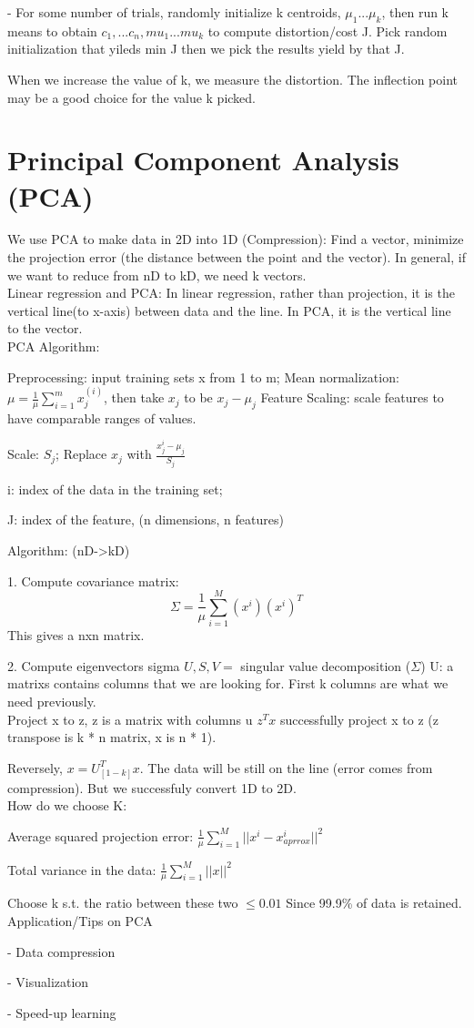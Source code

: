 \documentclass{article}
\begin{document}
- For some number of trials, randomly initialize k centroids, $\mu_1 ... \mu_k$, then run k means to obtain $c_1,...c_n, mu_1...mu_k$
to compute distortion/cost J. Pick random initialization that yileds min J
then we pick the results yield by that J.

When we increase the value of k, we measure the distortion. The inflection point may be a good choice for the value k picked.

\section*{Principal Component Analysis (PCA)}
We use PCA to make data in 2D into 1D (Compression): Find a vector, minimize the projection error (the distance between the point and the vector). In general, if we want to reduce from nD to kD, we need k vectors.\\


Linear regression and PCA: In linear regression, rather than projection, it is the vertical line(to x-axis) between data and the line. In PCA, it is the vertical line to the vector. \\

PCA Algorithm:

Preprocessing: input training sets x from 1 to m;
Mean normalization: $\mu = \frac{1}{\mu}\sum_{i=1}^m x_j^{(i)}$, then take $x_j$ to be $x_j - \mu_j$
Feature Scaling: scale features to have comparable ranges of values. 

Scale: $S_j$; Replace $x_j$ with $\frac{x_j^i - \mu_j}{S_j}$

i: index of the data in the training set; 

J: index of the feature, (n dimensions, n features)

Algorithm: (nD->kD)

1. Compute covariance matrix:
\[\Sigma = \frac{1}{\mu} \sum_{i=1}^M (x^i)(x^i)^T\]
This gives a nxn matrix.

2. Compute eigenvectors sigma
$U,S,V =$ singular value decomposition ($\Sigma $)
U: a matrixs contains columns that we are looking for. First k columns are what we need previously.\\

Project x to z, z is a matrix with columns u
$z^T x$ successfully project x to z (z transpose is k * n matrix, x is n * 1). 

Reversely, $x = U_{[1-k]}^T x$. The data will be still on the line (error comes from compression). But we successfuly convert 1D to 2D.\\

How do we choose K: 

Average squared projection error: $\frac{1}{\mu} \sum_{i=1}^M ||x^i - x_{aprrox}^i||^2$

Total variance in the data: $\frac{1}{\mu}\sum_{i=1}^M ||x||^2$

Choose k s.t. the ratio between these two $\leq 0.01$ Since 99.9\% of data is retained.\\

Application/Tips on PCA

- Data compression

- Visualization

- Speed-up learning
\end{document}
